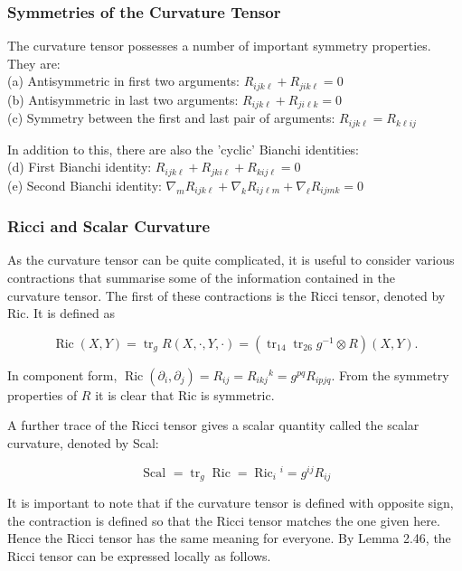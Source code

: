 \documentclass[10pt, letterpaper]{article}
\begin{document}
\subsubsection*{Symmetries of the Curvature Tensor}
The curvature tensor possesses a number of important symmetry properties. They are:\\
(a) Antisymmetric in first two arguments: $R_{i j k \ell}+R_{j i k \ell}=0$\\
(b) Antisymmetric in last two arguments: $R_{i j k \ell}+R_{j i \ell k}=0$\\
(c) Symmetry between the first and last pair of arguments: $R_{i j k \ell}=R_{k \ell i j}$

In addition to this, there are also the 'cyclic' Bianchi identities:\\
(d) First Bianchi identity: $R_{i j k \ell}+R_{j k i \ell}+R_{k i j \ell}=0$\\
(e) Second Bianchi identity: $\nabla_{m} R_{i j k \ell}+\nabla_{k} R_{i j \ell m}+\nabla_{\ell} R_{i j m k}=0$

\subsubsection*{Ricci and Scalar Curvature}
As the curvature tensor can be quite complicated, it is useful to consider various contractions that summarise some of the information contained in the\\
curvature tensor. The first of these contractions is the Ricci tensor, denoted by Ric. It is defined as

$$
\operatorname{Ric}(X, Y)=\operatorname{tr}_{g} R(X, \cdot, Y, \cdot)=\left(\operatorname{tr}_{14} \operatorname{tr}_{26} g^{-1} \otimes R\right)(X, Y) .
$$

In component form, $\operatorname{Ric}\left(\partial_{i}, \partial_{j}\right)=R_{i j}=R_{i k j}{ }^{k}=g^{p q} R_{i p j q}$. From the symmetry properties of $R$ it is clear that Ric is symmetric.

A further trace of the Ricci tensor gives a scalar quantity called the scalar curvature, denoted by Scal:

$$
\text { Scal }=\operatorname{tr}_{g} \operatorname{Ric}=\operatorname{Ric}_{i}{ }^{i}=g^{i j} R_{i j}
$$

It is important to note that if the curvature tensor is defined with opposite sign, the contraction is defined so that the Ricci tensor matches the one given here. Hence the Ricci tensor has the same meaning for everyone. By Lemma 2.46, the Ricci tensor can be expressed locally as follows.
\end{document}
